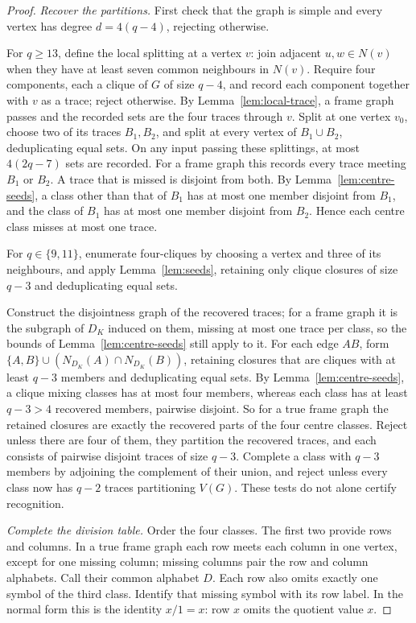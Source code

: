 \documentclass[11pt]{article}
\theoremstyle{definition}
\theoremstyle{remark}
\begin{document}
\begin{proof}
\emph{Recover the partitions.}
First check that the graph is simple and every vertex has degree
$d=4(q-4)$, rejecting otherwise.

For $q\ge13$, define the local splitting at a vertex $v$: join adjacent
$u,w\in N(v)$ when they have at least seven common neighbours in $N(v)$.
Require four components, each a clique of $G$ of size $q-4$, and record
each component together with $v$ as a trace; reject otherwise. By
Lemma~\ref{lem:local-trace}, a frame graph passes and the recorded sets
are the four traces through $v$. Split at one vertex $v_0$, choose two
of its traces $B_1,B_2$, and split at every vertex of $B_1\cup B_2$,
deduplicating equal sets. On any input passing these splittings, at
most $4(2q-7)$ sets are recorded. For a frame graph this records every
trace meeting $B_1$ or $B_2$. A trace that is missed is disjoint from both. By
Lemma~\ref{lem:centre-seeds}, a class other than that of $B_1$ has at
most one member disjoint from $B_1$, and the class of $B_1$ has at most
one member disjoint from $B_2$. Hence each centre class misses at most
one trace.

For $q\in\{9,11\}$, enumerate four-cliques by choosing a vertex and three
of its neighbours, and apply Lemma~\ref{lem:seeds}, retaining only clique
closures of size $q-3$ and deduplicating equal sets.

Construct the disjointness graph of the recovered traces; for a frame
graph it is the subgraph of $D_K$ induced on them, missing at most one
trace per class, so the bounds of Lemma~\ref{lem:centre-seeds} still
apply to it. For each edge
$AB$, form $\{A,B\}\cup(N_{D_K}(A)\cap N_{D_K}(B))$, retaining closures
that are cliques with at least $q-3$ members and deduplicating equal
sets. By Lemma~\ref{lem:centre-seeds}, a clique mixing classes has at
most four members, whereas each class has at least $q-3>4$ recovered
members, pairwise disjoint. So for a true frame graph the retained
closures are exactly the recovered parts of the four centre classes.
Reject unless there are four of them, they partition the recovered
traces, and each consists of pairwise disjoint traces of size $q-3$.
Complete a class with $q-3$ members by adjoining the complement of their
union, and reject unless every class now has $q-2$ traces partitioning
$V(G)$. These tests do not alone certify recognition.

\emph{Complete the division table.}
Order the four classes. The first two provide rows and columns. In a
true frame graph each row meets each column in one vertex, except for
one missing column; missing columns pair the row and column alphabets.
Call their common alphabet $D$. Each row also omits exactly one symbol
of the third class. Identify that missing symbol with its row label.
In the normal form this is the identity $x/1=x$: row $x$ omits the
quotient value $x$.


\end{proof}
\end{document}
